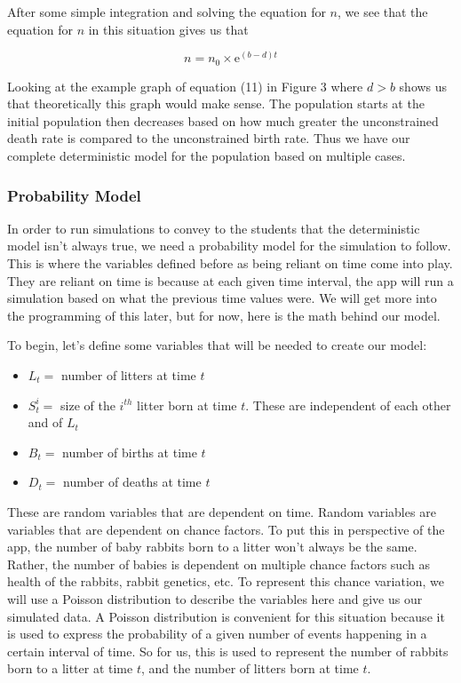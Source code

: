 \documentclass{article}\usepackage[]{graphicx}\usepackage[]{color}
\begin{document}
\noindent After some simple integration and solving the equation for \(n\), we see that the equation for \(n\) in this situation gives us that 

\begin{equation}
n = n_0 \times \mathrm{e}^{(b-d)t}
\end{equation}

Looking at the example graph of equation (11) in Figure 3 where \(d > b\) shows us that theoretically this graph would make sense. The population starts at the initial population then decreases based on how much greater the unconstrained death rate is compared to the unconstrained birth rate. Thus we have our complete deterministic model for the population based on multiple cases. 






\subsubsection{Probability Model}

In order to run simulations to convey to the students that the deterministic model isn't always true, we need a probability model for the simulation to follow. This is where the variables defined before as being reliant on time come into play. They are reliant on time is because at each given time interval, the app will run a simulation based on what the previous time values were. We will get more into the programming of this later, but for now, here is the math behind our model.

To begin, let's define some variables that will be needed to create our model:

\begin{itemize}

\item \(L_t =\) number of litters at time \(t\)

\item \(S_t^i =\) size of the \(i^{th}\) litter born at time \(t\). These are independent of each other and of \(L_t\)

\item \(B_t =\) number of births at time \(t\)

\item \(D_t =\) number of deaths at time \(t\)

\end{itemize}

\noindent These are random variables that are dependent on time. Random variables are variables that are dependent on chance factors. To put this in perspective of the app, the number of baby rabbits born to a litter won't always be the same. Rather, the number of babies is dependent on multiple chance factors such as health of the rabbits, rabbit genetics, etc. To represent this chance variation, we will use a Poisson distribution to describe the variables here and give us our simulated data. A Poisson distribution is convenient for this situation because it is used to express the probability of a given number of events happening in a certain interval of time. So for us, this is used to represent the number of rabbits born to a litter at time \(t\), and the number of litters born at time \(t\). 
\end{document}

